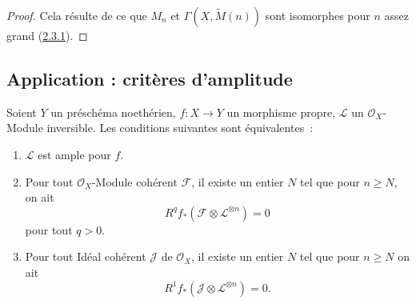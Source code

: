 \begin{proof}
Cela résulte de ce que $M_n$ et $\Gamma(X,\widetilde M(n))$ sont
isomorphes pour $n$ assez grand
(\hyperref[III.2.3.1-fr]{2.3.1}).
\end{proof}

\subsection{Application : critères d'amplitude}
\label{subsection:III.2.6-fr}

\begin{proposition}[2.6.1]
\label{III.2.6.1-fr}
Soient $Y$ un préschéma noethérien, $f:X\to Y$ un morphisme propre,
$\mathcal L$ un $\mathcal O_X$-Module inversible. Les conditions
suivantes sont équivalentes~:
\begin{enumerate}
\item[a)] $\mathcal L$ est ample pour $f$.
\item[b)] Pour tout $\mathcal O_X$-Module cohérent $\mathcal F$, il
existe un entier $N$ tel que pour $n\geq N$, on ait
\[
R^qf_*(\mathcal F\otimes\mathcal L^{\otimes n})=0
\]
pour tout $q>0$.
\item[c)] Pour tout Idéal cohérent $\mathcal J$ de $\mathcal O_X$, il
existe un entier $N$ tel que pour $n\geq N$ on ait
\[
R^1f_*(\mathcal J\otimes\mathcal L^{\otimes n})=0.
\]
\end{enumerate}
\end{proposition}

